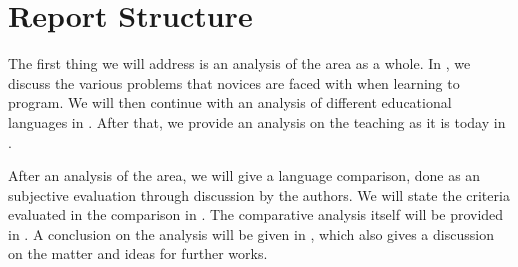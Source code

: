 \section{Report Structure}
The first thing we will address is an analysis of the area as a whole. In , we discuss the various problems that novices are faced with when learning to program. We will then continue with an analysis of different educational languages in . After that, we provide an analysis on the teaching as it is today in .

After an analysis of the area, we will give a language comparison, done as an subjective evaluation through discussion by the authors. We will state the criteria evaluated in the comparison in . The comparative analysis itself will be provided in . A conclusion on the analysis will be given in , which also gives a discussion on the matter and ideas for further works.





